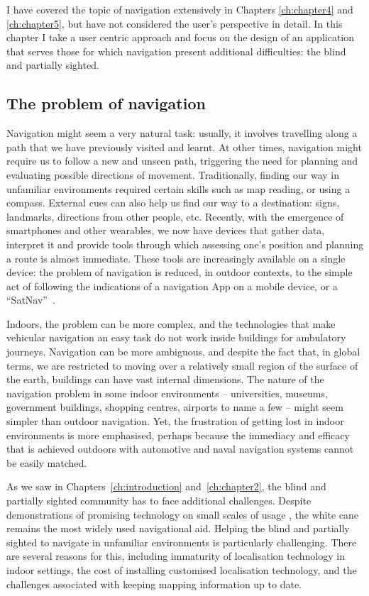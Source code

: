 I have covered the topic of navigation extensively in Chapters \ref{ch:chapter4} and \ref{ch:chapter5}, but have not considered the user's perspective in detail. In this chapter I take a user centric approach and focus on the design of an application that serves those for which navigation present additional difficulties: the blind and partially sighted.

\subsection{The problem of navigation}

Navigation might seem a very natural task: usually, it involves travelling along a path that we have previously visited and learnt. At other times, navigation might require us to follow a new and unseen path, triggering the need for planning and evaluating possible directions of movement. Traditionally, finding our way in unfamiliar environments required certain skills such as map reading, or using a compass. External cues can also help us find our way to a destination: signs, landmarks, directions from other people, etc. Recently, with the emergence of smartphones and other wearables, we now have devices that gather data, interpret it and provide tools through which assessing one's position and planning a route is almost immediate. These tools are increasingly available on a single device: the problem of navigation is reduced, in outdoor contexts, to the simple act of following the indications of a navigation App on a mobile device, or a ``SatNav''~\citep{spirkovska2005summary}.


Indoors, the problem can be more complex, and the technologies that make vehicular navigation an easy task do not work inside buildings for ambulatory journeys. Navigation can be more ambiguous, and despite the fact that, in global terms, we are restricted to moving over a relatively small region of the surface of the earth, buildings can have vast internal dimensions.  The nature of the navigation problem in some indoor environments -- universities, museums, government buildings, shopping centres, airports to name a few -- might seem simpler than outdoor navigation. Yet, the frustration of getting lost in indoor environments is more emphasised, perhaps because the immediacy and efficacy that is achieved outdoors with automotive and naval navigation systems cannot be easily matched.
 
As we saw in Chapters~\ref{ch:introduction} and~\ref{ch:chapter2}, the blind and partially sighted community has to face additional challenges. Despite demonstrations of promising technology on small scales of usage \citep{blindSquare,maidenbaum2013increasing,liu2010video}, the white cane remains the most widely used navigational aid. Helping the blind and partially sighted to navigate in unfamiliar environments is particularly challenging. There are several reasons for this, including immaturity of localisation technology in indoor settings, the cost of installing customised localisation technology, and the challenges associated with keeping mapping information up to date. 

